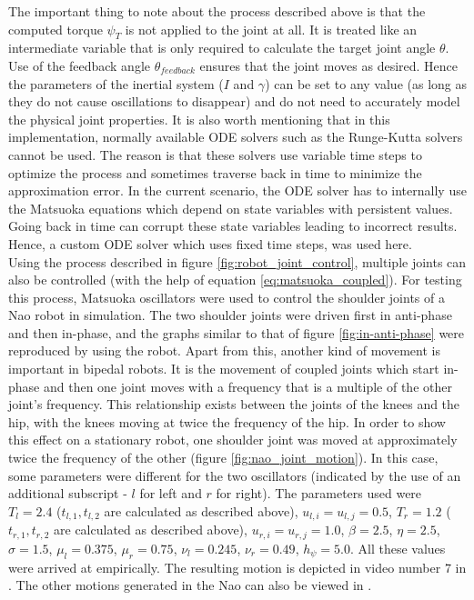 \documentclass[12pt,twoside]{article}
\theoremstyle{plain}
\theoremstyle{definition}
\theoremstyle{remark}
\newcommand{\forceindent}{\leavevmode{\parindent=2em\indent}}
\begin{document}
\forceindent The important thing to note about the process described above is that the computed torque $\psi_T$ is not applied to the joint at all. It is treated like an intermediate variable that is only required to calculate the target joint angle $\theta$. Use of the feedback angle $\theta_{feedback}$ ensures that the joint moves as desired. Hence the parameters of the inertial system ($I$ and $\gamma$) can be set to any value (as long as they do not cause oscillations to disappear) and do not need to accurately model the physical joint properties. It is also worth mentioning that in this implementation, normally available ODE solvers such as the Runge-Kutta solvers cannot be used. The reason is that these solvers use variable time steps to optimize the process and sometimes traverse back in time to minimize the approximation error. In the current scenario, the ODE solver has to internally use the Matsuoka equations which depend on state variables with persistent values. Going back in time can corrupt these state variables leading to incorrect results. Hence, a custom ODE solver which uses fixed time steps, was used here.\\
\forceindent Using the process described in figure \ref{fig:robot_joint_control}, multiple joints can also be controlled (with the help of equation \ref{eq:matsuoka_coupled}). For testing this process, Matsuoka oscillators were used to control the shoulder joints of a Nao robot in simulation. The two shoulder joints were driven first in anti-phase and then in-phase, and the graphs similar to that of figure \ref{fig:in-anti-phase} were reproduced by using the robot. Apart from this, another kind of movement is important in bipedal robots. It is the movement of coupled joints which start in-phase and then one joint moves with a frequency that is a multiple of the other joint's frequency. This relationship exists between the joints of the knees and the hip, with the knees moving at twice the frequency of the hip. In order to show this effect on a stationary robot, one shoulder joint was moved at approximately twice the frequency of the other (figure \ref{fig:nao_joint_motion}). In this case, some parameters were  different for the two oscillators (indicated by the use of an additional subscript - $l$ for left and $r$ for right). The parameters used were $T_l=2.4$ ($t_{l,1},t_{l,2}$ are calculated as described above), $u_{l,i}=u_{l,j}=0.5$, $T_r=1.2$ ($t_{r,1},t_{r,2}$ are calculated as described above), $u_{r,i}=u_{r,j}=1.0$, $\beta=2.5$, $\eta=2.5$, $\sigma=1.5$, $\mu_l=0.375$, $\mu_r=0.75$, $\nu_l=0.245$, $\nu_r=0.49$, $h_\psi=5.0$. All these values were arrived at empirically. The resulting motion is depicted in video number 7 in \cite{Vid_Nao_Matsuoka}. The other motions generated in the Nao can also be viewed in \cite{Vid_Nao_Matsuoka}.
\end{document}
